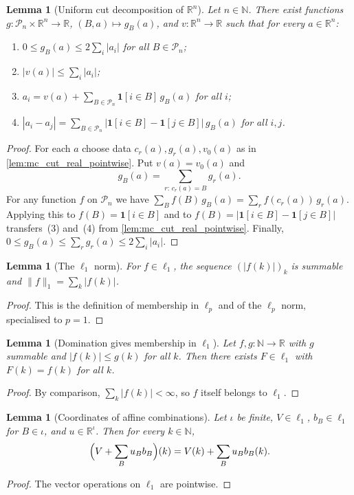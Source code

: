 \documentclass[11pt]{article}
\newtheorem{lemma}[theorem]{Lemma}
\theoremstyle{definition}
\theoremstyle{remark}
\newcommand{\R}{\mathbb{R}}
\newcommand{\N}{\mathbb{N}}
\newcommand{\Pn}{\mathcal{P}_n}
\newcommand{\one}{\mathbf{1}}
\newcommand{\lnorm}[1]{\lVert #1\rVert_{1}}
\begin{document}
\begin{lemma}[Uniform cut decomposition of $\R^n$]\label{lem:mc_cut_real}
Let $n\in\N$. There exist functions $g:\Pn\times\R^n\to\R$, $(B,a)\mapsto g_B(a)$, and $v:\R^n\to\R$ such that for every $a\in\R^n$:
\begin{enumerate}
\item $0\le g_B(a)\le2\sum_i|a_i|$ for all $B\in\Pn$;
\item $|v(a)|\le\sum_i|a_i|$;
\item $a_i=v(a)+\sum_{B\in\Pn}\one[i\in B]\,g_B(a)$ for all $i$;
\item $|a_i-a_j|=\sum_{B\in\Pn}\bigl|\one[i\in B]-\one[j\in B]\bigr|\,g_B(a)$ for all $i,j$.
\end{enumerate}
\end{lemma}
\begin{proof}
For each $a$ choose data $c_r(a),g_r(a),v_0(a)$ as in \cref{lem:mc_cut_real_pointwise}. Put $v(a)=v_0(a)$ and
\[
g_B(a)=\sum_{r:\,c_r(a)=B}g_r(a).
\]
For any function $f$ on $\Pn$ we have $\sum_Bf(B)\,g_B(a)=\sum_rf(c_r(a))\,g_r(a)$. Applying this to $f(B)=\one[i\in B]$ and to $f(B)=|\one[i\in B]-\one[j\in B]|$ transfers~(3) and~(4) from \cref{lem:mc_cut_real_pointwise}. Finally, $0\le g_B(a)\le\sum_rg_r(a)\le2\sum_i|a_i|$.
\end{proof}

\begin{lemma}[The $\ell_1$ norm]\label{lem:mc_L1_norm}
For $f\in\ell_1$, the sequence $(|f(k)|)_k$ is summable and $\lnorm f=\sum_k|f(k)|$.
\end{lemma}
\begin{proof}
This is the definition of membership in $\ell_p$ and of the $\ell_p$ norm, specialised to $p=1$.
\end{proof}

\begin{lemma}[Domination gives membership in $\ell_1$]\label{lem:mc_L1_of_bound}
Let $f,g:\N\to\R$ with $g$ summable and $|f(k)|\le g(k)$ for all $k$. Then there exists $F\in\ell_1$ with $F(k)=f(k)$ for all $k$.
\end{lemma}
\begin{proof}
By comparison, $\sum_k|f(k)|<\infty$, so $f$ itself belongs to $\ell_1$.
\end{proof}

\begin{lemma}[Coordinates of affine combinations]\label{lem:mc_L1_affine_apply}
Let $\iota$ be finite, $V\in\ell_1$, $b_B\in\ell_1$ for $B\in\iota$, and $u\in\R^\iota$. Then for every $k\in\N$,
\[
\Bigl(V+\sum_Bu_Bb_B\Bigr)(k)=V(k)+\sum_Bu_Bb_B(k).
\]
\end{lemma}
\begin{proof}
The vector operations on $\ell_1$ are pointwise.
\end{proof}
\end{document}
